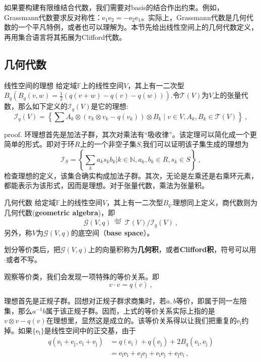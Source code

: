 


如果要构建有限维结合代数，我们需要对basis的结合作出约束。例如，Grassmann代数要求反对称性：$\mathrm {e_1e_2}=-\mathrm {e_2e_1}$。实际上，Grassmann代数是几何代数的一个平凡特例，或者也可以理解为。本节先给出线性空间上的几何代数定义，再用集合语言将其拓展为Clifford代数。
\subsection{几何代数}
\begin{theorem}{线性空间的理想}
给定域$\mathbb F$上的线性空间$V$，其上有一二次型$B_q(B_q(v,w)=\frac{1}{2}(q(v+w)-q(v)-q(w)))$.令$\mathcal T(V)$为$V$上的张量代数，那么如下定义的$\mathcal {I}_q(V)$是它的理想:
\begin{equation}
\mathcal{I}_{q}(V)=\left\{\sum A_{k} \otimes(v_k \otimes v_k-q(v_k)) \otimes B_{k} \mid v \in V, A_{k}, B_{k} \in \mathcal{T}(V)\right\}~,
\end{equation}
\end{theorem}
proof.
环理想首先是加法子群，其次对乘法有“吸收律”。该定理可以简化成一个更简单的形式。即对于环$R$上的一个非空子集$S$,我们可以证明该子集生成的理想为
\begin{equation}
\mathcal {I}_S=\left\{\sum _k a_k s_kb_k|k\in \mathbb N ,a_k,b_k\in R,s_k\in S\right\}~,
\end{equation}
检查理想的定义，该集合确实构成加法子群。其次，无论是左乘还是右乘环元素，都能表示为该形式，因而是理想。对于张量代数，乘法为张量积。

\begin{definition}{几何代数}
给定域$\mathbb F$上的线性空间$V$，其上有一二次型$B_q$.理想同上定义，商代数则为几何代数(\textbf{geometric algebra})，即
\begin{equation}
\mathcal{G}(V, q) \stackrel{\text { def }}{=} \mathcal{T}(V) / \mathcal{I}_{q}(V)~,
\end{equation}
另外，称$V$为$\mathcal{G}(V, q)$的底空间（\textbf{base space}）。
\end{definition}
划分等价类后，把$\mathcal{G}(V, q)$上的向量积称为\textbf{几何积}，或者\textbf{Clifford积}，符号可以用$\cdot$或者不写。

观察等价类，我们会发现一项特殊的等价关系。即
\begin{equation}
v\cdot v=q(v)~,
\end{equation}

理想首先是正规子群。回想对正规子群求商集时，若$a,b$等价，即属于同一左陪集，那么$a^{-1}b$属于该正规子群。因而，上式的等价关系实际上指的是
$v \otimes v-q(v)$在理想里，显然这是成立的。该等价关系得以让我们把重复的$\mathrm {e_i}$约掉。如果$\{\mathrm{e_i}\}$是线性空间中的正交基，由于
\begin{equation}
\begin{aligned}
q(\mathrm{e_i+e_j,e_i+e_j})&=q(\mathrm{e_i})+q(\mathrm{e_j})+2 B_q(\mathrm{e_i,e_j})\\
&=\mathrm{e_ie_i+e_je_j+e_ie_j+e_je_i}~,
\end{aligned}
\end{equation}

